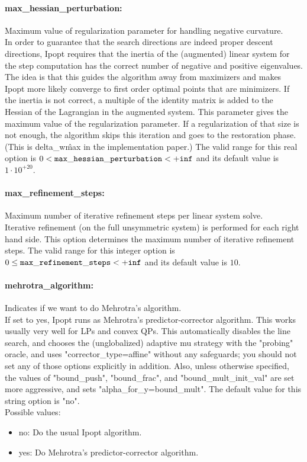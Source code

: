 \paragraph{max\_hessian\_perturbation:}\label{sec:max_hessian_perturbation} Maximum value of regularization parameter for handling negative curvature. $\;$ \\
 In order to guarantee that the search directions
are indeed proper descent directions, Ipopt
requires that the inertia of the (augmented)
linear system for the step computation has the
correct number of negative and positive
eigenvalues. The idea is that this guides the
algorithm away from maximizers and makes Ipopt
more likely converge to first order optimal
points that are minimizers. If the inertia is not
correct, a multiple of the identity matrix is
added to the Hessian of the Lagrangian in the
augmented system. This parameter gives the
maximum value of the regularization parameter. If
a regularization of that size is not enough, the
algorithm skips this iteration and goes to the
restoration phase. (This is delta\_w\^max in the
implementation paper.) The valid range for this real option is 
$0 <  {\tt max\_hessian\_perturbation } <  {\tt +inf}$
and its default value is $1 \cdot 10^{+20}$.


\paragraph{max\_refinement\_steps:}\label{sec:max_refinement_steps} Maximum number of iterative refinement steps per linear system solve. $\;$ \\
 Iterative refinement (on the full unsymmetric
system) is performed for each right hand side. 
This option determines the maximum number of
iterative refinement steps. The valid range for this integer option is
$0 \le {\tt max\_refinement\_steps } <  {\tt +inf}$
and its default value is $10$.


\paragraph{mehrotra\_algorithm:}\label{sec:mehrotra_algorithm} Indicates if we want to do Mehrotra's algorithm. $\;$ \\
 If set to yes, Ipopt runs as Mehrotra's
predictor-corrector algorithm. This works usually
very well for LPs and convex QPs.  This
automatically disables the line search, and
chooses the (unglobalized) adaptive mu strategy
with the "probing" oracle, and uses
"corrector\_type=affine" without any safeguards;
you should not set any of those options
explicitly in addition.  Also, unless otherwise
specified, the values of "bound\_push",
"bound\_frac", and "bound\_mult\_init\_val" are
set more aggressive, and sets
"alpha\_for\_y=bound\_mult".
The default value for this string option is "no".
\\ 
Possible values:
\begin{itemize}
   \item no: Do the usual Ipopt algorithm.
   \item yes: Do Mehrotra's predictor-corrector algorithm.
\end{itemize}

